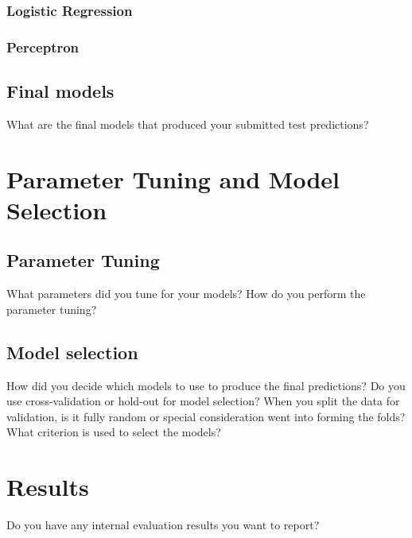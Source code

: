 \documentclass[11pt,a4paper]{article}
\begin{document}
\subsubsection{Logistic Regression}

\subsubsection{Perceptron}


\subsection{Final models}
What are the final models that produced your submitted test predictions?


\section{Parameter Tuning and Model Selection }

\subsection{Parameter Tuning}
What parameters did you tune for your models? How do you perform the parameter tuning?

\subsection{Model selection}
How did you decide which models to use to produce the final predictions?  Do you use cross-validation or hold-out for model selection? When you split the data for validation, is it fully random or special consideration went into forming the folds? What criterion is used to select the models?


\section{Results}
Do you have any internal evaluation results you want to report?
\end{document}
